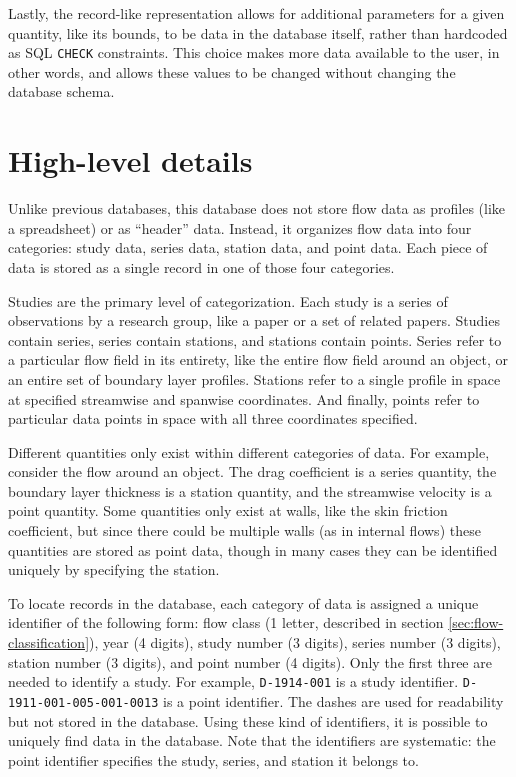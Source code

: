 Lastly, the record-like representation allows for additional parameters for a
given quantity, like its bounds, to be data in the database itself, rather than
hardcoded as SQL \texttt{CHECK} constraints.  This choice makes more data
available to the user, in other words, and allows these values to be changed
without changing the database schema.


\section{High-level details}

Unlike previous databases, this database does not store flow data as profiles
(like a spreadsheet) or as ``header'' data.  Instead, it organizes flow data
into four categories: study data, series data, station data, and point data.
Each piece of data is stored as a single record in one of those four
categories.

Studies are the primary level of categorization.  Each study is a series of
observations by a research group, like a paper or a set of related papers.
Studies contain series, series contain stations, and stations contain points.
Series refer to a particular flow field in its entirety, like the entire flow
field around an object, or an entire set of boundary layer profiles.  Stations
refer to a single profile in space at specified streamwise and spanwise
coordinates.  And finally, points refer to particular data points in space with
all three coordinates specified.

Different quantities only exist within different categories of data.  For
example, consider the flow around an object.  The drag coefficient is a series
quantity, the boundary layer thickness is a station quantity, and the
streamwise velocity is a point quantity.  Some quantities only exist at walls,
like the skin friction coefficient, but since there could be multiple walls (as
in internal flows) these quantities are stored as point data, though in many
cases they can be identified uniquely by specifying the station.

To locate records in the database, each category of data is assigned a unique
identifier of the following form: flow class (1 letter, described in section
\ref{sec:flow-classification}), year (4 digits), study number (3 digits),
series number (3 digits), station number (3 digits), and point number (4
digits).  Only the first three are needed to identify a study.  For example,
\texttt{D-1914-001} is a study identifier.  \texttt{D-1911-001-005-001-0013} is
a point identifier.  The dashes are used for readability but not stored in the
database.  Using these kind of identifiers, it is possible to uniquely find
data in the database.  Note that the identifiers are systematic: the point
identifier specifies the study, series, and station it belongs to.

